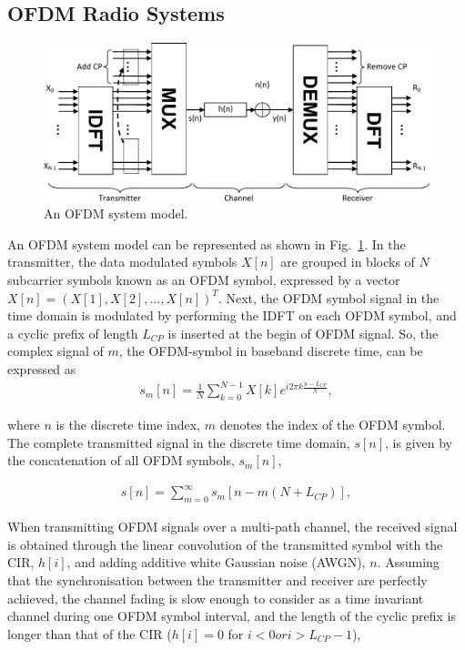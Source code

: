 \subsection{OFDM Radio Systems}
\begin{figure}
	\centerline{\includegraphics [width=0.8\columnwidth] {Figures/OFDM-model.pdf} }
	\caption{An OFDM system model.}
	\label{fig:OFDM-model}
\end{figure}
An OFDM system model can be represented as shown in Fig.~\ref{fig:OFDM-model}.
In the transmitter, the data modulated symbols $X[n]$ are grouped in blocks of $N$ subcarrier symbols known as an OFDM symbol, expressed by a vector $X[n]=(X[1], X[2], ..., X[n])^T$.
Next, the OFDM symbol signal in the time domain is modulated by performing the IDFT on each OFDM symbol, and a cyclic prefix of length $L_{CP}$ is inserted at the begin of OFDM signal.
So, the complex signal of $m$, the OFDM-symbol in baseband discrete time, can be expressed as
\begin{eqnarray}
\label{equ:OFDMsymbol}
s_{m}[n] = \frac{1}{N} \sum_{k=0}^{N-1}X[k]e^{i2\pi k\frac{n-L_{CP}}{N}},
\end{eqnarray}

where $n$ is the discrete time index, $m$ denotes the index of the OFDM symbol.
The complete transmitted signal in the discrete time domain, $s[n]$, is given by the concatenation of all OFDM symbols, $s_{m}[n]$,

\begin{eqnarray}
\label{equ:OFDMsignal}
s[n] =  \sum_{m=0}^{\infty} s_{m}[n-m(N+L_{CP})],
\end{eqnarray}

When transmitting OFDM signals over a multi-path channel, the received signal is obtained through the linear convolution of the transmitted symbol with the CIR, $h[i]$, and adding additive white Gaussian noise (AWGN), $n$.
Assuming that the synchronisation between the transmitter and receiver are perfectly achieved, the channel fading is slow enough to consider as a time invariant channel during one OFDM symbol interval, and the length of the cyclic prefix is longer than that of the CIR ($h[i] = 0$ for $i < 0 or i > L_{CP}-1$),

